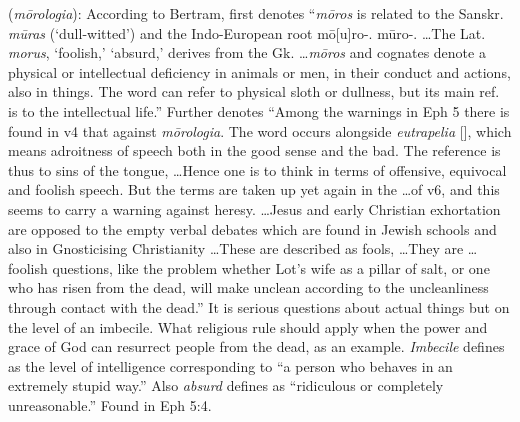 \item[Absurd talk,]

(\textit{mōrologia}):
According to Bertram,  first denotes ``\emph{mōros} is related to the Sanskr. \emph{mūras} (`dull-witted') and the Indo-European root mō[u]ro-. mūro-. \ldots The Lat. \emph{morus}, `foolish,' `absurd,' derives from the Gk. \ldots \emph{mōros} and cognates denote a physical or intellectual deficiency in animals or men, in their conduct and actions, also in things. The word can refer to physical sloth or dullness, but its main ref. is to the intellectual life.''
Further  denotes ``Among the warnings in Eph 5 there is found in v4 that against \emph{mōrologia}. The word occurs alongside \emph{eutrapelia} [], which means adroitness of speech both in the good sense and the bad. The reference is thus to sins of the tongue, \ldots Hence one is to think in terms of offensive, equivocal and foolish speech. But the terms are taken up yet again in the \ldots of v6, and this seems to carry a warning against heresy. \ldots Jesus and early Christian exhortation are opposed to the empty verbal debates which are found in Jewish schools and also in Gnosticising Christianity \ldots These are described as fools, \ldots They are \ldots foolish questions, like the problem whether Lot's wife as a pillar of salt, or one who has risen from the dead, will make unclean according to the uncleanliness through contact with the dead.''
It is serious questions about actual things but on the level of an imbecile. What religious rule should apply when the power and grace of God can resurrect people from the dead, as an example. \emph{Imbecile} defines as the level of intelligence corresponding to ``a person who behaves in an extremely stupid way.'' Also \emph{absurd} defines as ``ridiculous or completely unreasonable.''
Found in Eph 5:4.
